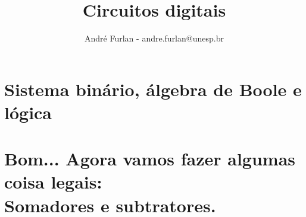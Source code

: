 

\title{Circuitos digitais}


\author{André Furlan - andre.furlan@unesp.br}

\date{\the\year}


	
	\frame{\titlepage}
	
	\section{Sistema binário, álgebra de Boole e lógica}
		
		

	\section{Bom... Agora vamos fazer algumas coisa legais: \\Somadores e subtratores.}
		

%		
	
